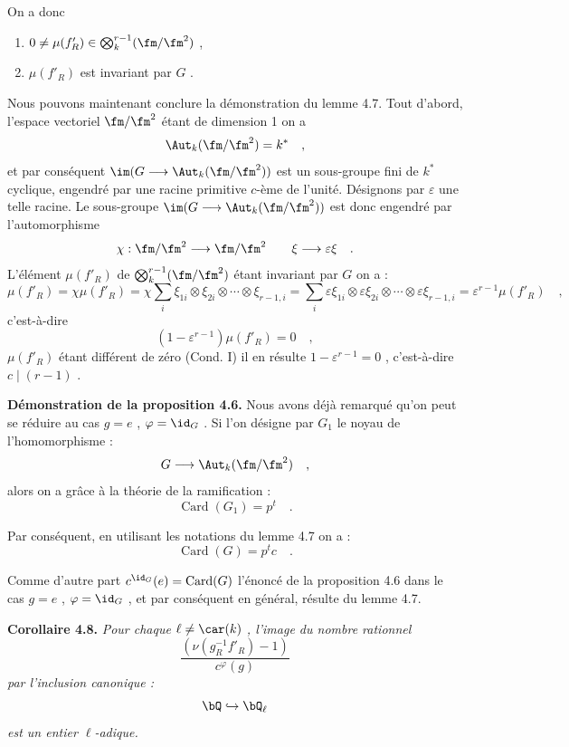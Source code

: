 On a donc
\begin{enumerate}
\item[I)] $0 \neq \mu(f'_R) \in \bigotimes_k^{r-1}(\fm/\fm^2)$ ,
\item[II)] $\mu(f'_R)$ est
invariant par $G$ .
\end{enumerate}

Nous pouvons maintenant conclure la démonstration du lemme 4.7. Tout d'abord, l'espace vectoriel $\fm/\fm^2$ étant de dimension 1 on a
\[
\Aut_k(\fm/\fm^2) = k^* \quad ,
\]
et par conséquent $\im(G \longrightarrow \Aut_k(\fm/\fm^2))$ est un sous-groupe fini de $k^*$ cyclique, engendré par une racine primitive $c$-ème de l'unité. Désignons par $\varepsilon$ une telle racine. Le sous-groupe $\im(G \longrightarrow \Aut_k(\fm/\fm^2))$ est donc engendré par l'automorphisme
\[
\chi : \fm/\fm^2 \longrightarrow \fm/\fm^2 \quad \quad \xi \longrightarrow \varepsilon\xi \quad .
\]
L'élément $\mu(f'_R)$ de $\bigotimes_k^{r-1}(\fm/\fm^2)$ étant invariant par $G$ on a :
\[
\mu(f'_R) = \chi\mu(f'_R) = \chi\sum_i \xi_{1i} \otimes \xi_{2i} \otimes \cdots \otimes \xi_{r-1,i} = \sum_i \varepsilon\xi_{1i} \otimes \varepsilon\xi_{2i} \otimes \cdots \otimes \varepsilon\xi_{r-1,i} = \varepsilon^{r-1}\mu(f'_R) \quad ,
\]
c'est-à-dire
\[
(1 - \varepsilon^{r-1})\mu(f'_R) = 0 \quad ,
\]
$\mu(f'_R)$ étant différent de zéro (Cond. I) il en résulte $1 - \varepsilon^{r-1} = 0$ , c'est-à-dire $c \mid (r-1)$ .

\medskip

\noindent
\textbf{Démonstration de la proposition 4.6.} Nous avons déjà remarqué qu'on peut se réduire au cas $g = e$ , $\varphi = \id_G$ . Si l'on désigne par $G_1$ le noyau de l'homomorphisme :
\[
G \longrightarrow \Aut_k(\fm/\fm^2) \quad ,
\]
alors on a grâce à la théorie de la ramification :
\[
\operatorname{Card}(G_1) = p^t \quad .
\]

Par conséquent, en utilisant les notations du lemme 4.7 on a :
\[
\operatorname{Card}(G) = p^t c \quad .
\]

Comme d'autre part $c^{\id_G}(e) = \operatorname{Card}(G)$ l'énoncé de la proposition 4.6 dans le cas $g = e$ , $\varphi = \id_G$ , et par conséquent en général, résulte du lemme 4.7.

\medskip
\noindent
\textbf{Corollaire 4.8.} \emph{Pour chaque $\ell \neq \car(k)$ , l'image du nombre rationnel
\[
\frac{(\nu(g_R^{-1}f'_R) - 1)}{c^\varphi(g)}
\]
par l'inclusion canonique :
\[
\bQ \hookrightarrow \bQ_\ell
\]
est un entier $\ell$-adique.}


